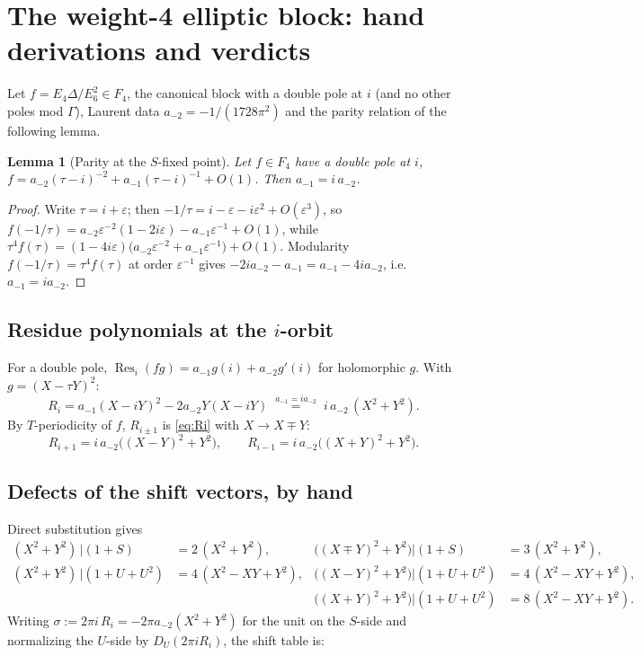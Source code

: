 \documentclass[11pt]{article}
\newtheorem{lemma}{Lemma}
\theoremstyle{definition}
\theoremstyle{remark}
\newcommand{\Res}{\operatorname{Res}}
\begin{document}
\section{The weight-4 elliptic block: hand derivations and verdicts}\label{sec:k4}

Let $f=E_4\Delta/E_6^2\in F_4$, the canonical block with a double pole at $i$ (and no
other poles mod $\Gamma$), Laurent data $a_{-2}=-1/(1728\pi^2)$ and the parity relation
of the following lemma.

\begin{lemma}[Parity at the $S$-fixed point]\label{lem:parity}
Let $f\in F_4$ have a double pole at $i$,
$f=a_{-2}(\tau-i)^{-2}+a_{-1}(\tau-i)^{-1}+O(1)$.  Then $a_{-1}=i\,a_{-2}$.
\end{lemma}

\begin{proof}
Write $\tau=i+\varepsilon$; then $-1/\tau=i-\varepsilon-i\varepsilon^2+O(\varepsilon^3)$,
so $f(-1/\tau)=a_{-2}\varepsilon^{-2}(1-2i\varepsilon)-a_{-1}\varepsilon^{-1}+O(1)$,
while $\tau^4f(\tau)=(1-4i\varepsilon)\big(a_{-2}\varepsilon^{-2}
+a_{-1}\varepsilon^{-1}\big)+O(1)$.  Modularity $f(-1/\tau)=\tau^4f(\tau)$ at order
$\varepsilon^{-1}$ gives $-2ia_{-2}-a_{-1}=a_{-1}-4ia_{-2}$, i.e.\ $a_{-1}=ia_{-2}$.
\end{proof}

\subsection{Residue polynomials at the $i$-orbit}
For a double pole, $\Res_i(fg)=a_{-1}g(i)+a_{-2}g'(i)$ for holomorphic $g$.  With
$g=(X-\tau Y)^2$:
\begin{equation}\label{eq:Ri}
R_i = a_{-1}(X-iY)^2 - 2a_{-2}Y(X-iY)
\;\overset{a_{-1}=ia_{-2}}{=}\;
i\,a_{-2}\,(X^2+Y^2).
\end{equation}
By $T$-periodicity of $f$, $R_{i\pm1}$ is \eqref{eq:Ri} with $X\to X\mp Y$:
\begin{equation}\label{eq:Ripm}
R_{i+1}=i\,a_{-2}\big((X-Y)^2+Y^2\big),\qquad
R_{i-1}=i\,a_{-2}\big((X+Y)^2+Y^2\big).
\end{equation}

\subsection{Defects of the shift vectors, by hand}
Direct substitution gives
\[
\begin{aligned}
(X^2+Y^2)\,\big|(1+S) &= 2\,(X^2+Y^2), &
\big((X\mp Y)^2+Y^2\big)\big|(1+S) &= 3\,(X^2+Y^2),\\[2pt]
(X^2+Y^2)\,\big|(1+U+U^2) &= 4\,(X^2-XY+Y^2), &
\big((X-Y)^2+Y^2\big)\big|(1+U+U^2) &= 4\,(X^2-XY+Y^2),\\
&&\big((X+Y)^2+Y^2\big)\big|(1+U+U^2) &= 8\,(X^2-XY+Y^2).
\end{aligned}
\]
Writing $\sigma:=2\pi i\,R_i=-2\pi a_{-2}(X^2+Y^2)$ for the unit on the $S$-side and
normalizing the $U$-side by $D_U(2\pi iR_i)$, the shift table is:
\end{document}
